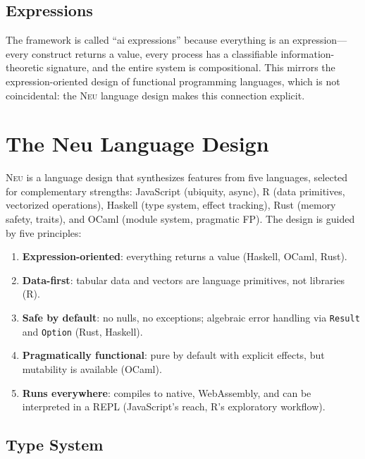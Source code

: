 \documentclass[11pt,letterpaper]{article}
\newcommand{\neu}{\textsc{Neu}}
\begin{document}
\subsection{Expressions}

The framework is called ``ai expressions'' because everything is an expression---every construct returns a value, every process has a classifiable information-theoretic signature, and the entire system is compositional. This mirrors the expression-oriented design of functional programming languages, which is not coincidental: the \neu{} language design makes this connection explicit.

\section{The Neu Language Design}
\label{sec:neu-design}

\neu{} is a language design that synthesizes features from five languages, selected for complementary strengths: JavaScript (ubiquity, async), R (data primitives, vectorized operations), Haskell (type system, effect tracking), Rust (memory safety, traits), and OCaml (module system, pragmatic FP). The design is guided by five principles:

\begin{enumerate}[leftmargin=*]
  \item \textbf{Expression-oriented}: everything returns a value (Haskell, OCaml, Rust).
  \item \textbf{Data-first}: tabular data and vectors are language primitives, not libraries (R).
  \item \textbf{Safe by default}: no nulls, no exceptions; algebraic error handling via \texttt{Result} and \texttt{Option} (Rust, Haskell).
  \item \textbf{Pragmatically functional}: pure by default with explicit effects, but mutability is available (OCaml).
  \item \textbf{Runs everywhere}: compiles to native, WebAssembly, and can be interpreted in a REPL (JavaScript's reach, R's exploratory workflow).
\end{enumerate}

\subsection{Type System}
\end{document}
